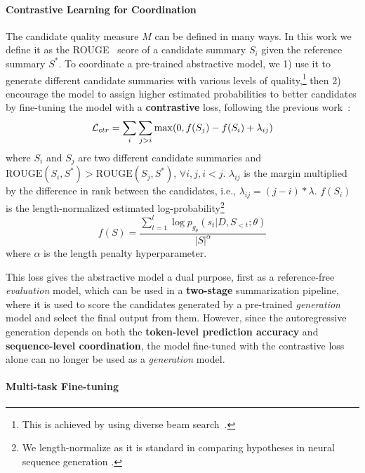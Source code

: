 \documentclass[11pt]{article}
\begin{document}
\paragraph{Contrastive Learning for Coordination}
The candidate quality measure $M$ can be defined in many ways. 
In this work we define it as the ROUGE~\citep{lin-2004-rouge} score of a candidate summary $S_i$ given the reference summary $S^*$.
To coordinate a pre-trained abstractive model, we 1) use it to generate different candidate summaries with various levels of quality,\footnote{This is achieved by using diverse beam search~\citep{Vijayakumar_Cogswell_Selvaraju_Sun_Lee_Crandall_Batra_2018}.}
then 2) encourage the model to assign higher estimated probabilities to better candidates by fine-tuning the model with a \textbf{contrastive} loss, following the previous work~\citep{hopkins-may-2011-tuning, zhong-etal-2020-extractive}:
\begin{equation}
\small
\label{eq:contr}
      \mathcal{L}_{ctr} = \sum_i \sum_{j > i} \max(0, f(S_j) - f(S_i) + \lambda_{ij})
\end{equation}
where $S_i$ and $S_j$ are two different candidate summaries and $\textrm{ROUGE}(S_i, S^*) > \textrm{ROUGE}(S_j, S^*)$, $ \forall i, j, i < j$.
$\lambda_{ij}$ is the margin multiplied by the difference in rank between the candidates, i.e., $\lambda_{ij} = (j - i) * \lambda $. 
$f(S_i)$ is the length-normalized estimated log-probability\footnote{We length-normalize as it is standard in comparing hypotheses in neural sequence generation \citep{cho-etal-2014-properties}.}
\begin{equation}
    f(S) = \frac{\sum_{t=1}^{l} \log p_{g_\theta} (s_t |D, S_{<t}; \theta)}{|S|^\alpha}
\label{eq:score}
\end{equation}
where $\alpha$ is the length penalty hyperparameter.

This loss gives the abstractive model a dual purpose, first as a reference-free \textit{evaluation} model, which can be used in a \textbf{two-stage} summarization pipeline, where it is used to score the candidates generated by a pre-trained \textit{generation} model and select the final output from them. 
However, since the autoregressive generation depends on both the \textbf{token-level prediction accuracy} and \textbf{sequence-level coordination}, the model fine-tuned with the contrastive loss alone can no longer be used as a \textit{generation} model. 

\paragraph{Multi-task Fine-tuning}
\end{document}
